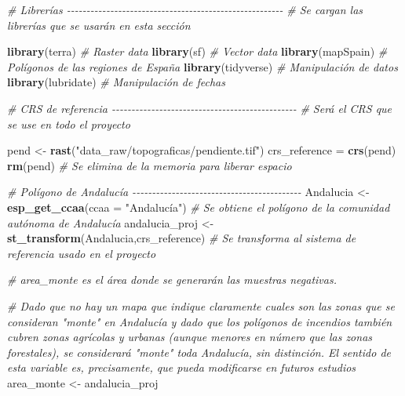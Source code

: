 \documentclass[12pt,a4paper,]{book}
\newenvironment{Shaded}{\begin{snugshade}}{\end{snugshade}}
\newcommand{\AttributeTok}[1]{\textcolor[rgb]{0.13,0.29,0.53}{#1}}
\newcommand{\CommentTok}[1]{\textcolor[rgb]{0.56,0.35,0.01}{\textit{#1}}}
\newcommand{\FunctionTok}[1]{\textcolor[rgb]{0.13,0.29,0.53}{\textbf{#1}}}
\newcommand{\NormalTok}[1]{#1}
\newcommand{\OtherTok}[1]{\textcolor[rgb]{0.56,0.35,0.01}{#1}}
\newcommand{\StringTok}[1]{\textcolor[rgb]{0.31,0.60,0.02}{#1}}
\numberwithin{dummy}{section}
\theoremstyle{ocrenumbox}
\theoremstyle{blacknumex}
\theoremstyle{blacknumbox}
\theoremstyle{ocrenum}
\theoremstyle{ocrenum}
\begin{document}
\begin{Shaded}
\begin{Highlighting}[]
\CommentTok{\# Librerías {-}{-}{-}{-}{-}{-}{-}{-}{-}{-}{-}{-}{-}{-}{-}{-}{-}{-}{-}{-}{-}{-}{-}{-}{-}{-}{-}{-}{-}{-}{-}{-}{-}{-}{-}{-}{-}{-}{-}{-}{-}{-}{-}{-}{-}{-}{-}{-}{-}{-}{-}{-}{-}{-}{-}}
\CommentTok{\# Se cargan las librerías que se usarán en esta sección}

\FunctionTok{library}\NormalTok{(terra) }\CommentTok{\# Raster data}
\FunctionTok{library}\NormalTok{(sf) }\CommentTok{\# Vector data}
\FunctionTok{library}\NormalTok{(mapSpain) }\CommentTok{\# Polígonos de las regiones de España}
\FunctionTok{library}\NormalTok{(tidyverse) }\CommentTok{\# Manipulación de datos}
\FunctionTok{library}\NormalTok{(lubridate) }\CommentTok{\# Manipulación de fechas}


\CommentTok{\# CRS de referencia {-}{-}{-}{-}{-}{-}{-}{-}{-}{-}{-}{-}{-}{-}{-}{-}{-}{-}{-}{-}{-}{-}{-}{-}{-}{-}{-}{-}{-}{-}{-}{-}{-}{-}{-}{-}{-}{-}{-}{-}{-}{-}{-}{-}{-}{-}{-}}
\CommentTok{\# Será el CRS que se use en todo el proyecto}

\NormalTok{pend }\OtherTok{\textless{}{-}} \FunctionTok{rast}\NormalTok{(}\StringTok{"data\_raw/topograficas/pendiente.tif"}\NormalTok{)}
\NormalTok{crs\_reference }\OtherTok{=} \FunctionTok{crs}\NormalTok{(pend)}
\FunctionTok{rm}\NormalTok{(pend) }\CommentTok{\# Se elimina de la memoria para liberar espacio}


\CommentTok{\# Polígono de Andalucía {-}{-}{-}{-}{-}{-}{-}{-}{-}{-}{-}{-}{-}{-}{-}{-}{-}{-}{-}{-}{-}{-}{-}{-}{-}{-}{-}{-}{-}{-}{-}{-}{-}{-}{-}{-}{-}{-}{-}{-}{-}{-}{-}}
\NormalTok{Andalucia }\OtherTok{\textless{}{-}} \FunctionTok{esp\_get\_ccaa}\NormalTok{(}\AttributeTok{ccaa =} \StringTok{"Andalucía"}\NormalTok{) }\CommentTok{\# Se obtiene el polígono de la comunidad autónoma de Andalucía}
\NormalTok{andalucia\_proj }\OtherTok{\textless{}{-}} \FunctionTok{st\_transform}\NormalTok{(Andalucia,crs\_reference) }\CommentTok{\# Se transforma al sistema de referencia usado en el proyecto}

\CommentTok{\# area\_monte es el área donde se generarán las muestras negativas.}

\CommentTok{\# Dado que no hay un mapa que indique claramente cuales son las zonas que se consideran "monte" en Andalucía y dado que los polígonos de incendios también cubren zonas agrícolas y urbanas (aunque menores en número que las zonas forestales), se considerará "monte" toda Andalucía, sin distinción. El sentido de esta variable es, precisamente, que pueda modificarse en futuros estudios}
\NormalTok{area\_monte }\OtherTok{\textless{}{-}}\NormalTok{ andalucia\_proj}


\end{Highlighting}
\end{Shaded}
\end{document}
